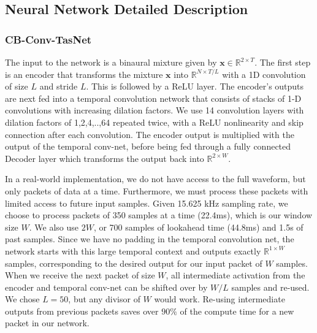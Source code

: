 \documentclass [11pt, proquest] {uwthesis}[2020/02/24]
\begin{document}
\subsection{Neural Network Detailed Description}


\subsubsection{CB-Conv-TasNet}
The input to the network is a binaural mixture given by $\textbf{x} \in \mathbb{R}^{2 \times T}$. The first step is an encoder that transforms the mixture $\textbf{x}$ into $\mathbb{R}^{N \times T/L}$ with a 1D convolution of size $L$ and stride $L$. This is followed by a ReLU layer. The encoder's outputs are next fed into a temporal convolution network that consists of stacks of 1-D convolutions with increasing dilation factors. We use 14 convolution layers with dilation factors of 1,2,4,..,64 repeated twice, with a ReLU nonlinearity and skip connection after each convolution. The encoder output is multiplied with the output of the temporal conv-net, before being fed through a fully connected Decoder layer which transforms the output back into $\mathbb{R}^{2 \times W}$. %



In a real-world implementation, we do not have access to the full waveform, but only packets of data at a time. Furthermore, we must process these packets with limited access to future input samples. Given  15.625 kHz sampling rate, we choose to process packets of 350 samples at a time (22.4ms), which is our  window size $W$. We also use $2W$, or 700 samples of lookahead time (44.8ms) and 1.5s of past samples. Since we have no padding in the temporal convolution net, the network starts with this large temporal context and outputs exactly $\mathbb{R}^{1 \times W}$ samples, corresponding to the desired output for our input packet of $W$ samples. When we receive the next packet of size $W$, all intermediate activation from the encoder and temporal conv-net can be shifted over by $W / L$ samples and re-used. We chose $L = 50$, but any divisor of $W$ would work. Re-using intermediate outputs from previous packets saves over $90\%$ of the compute time for a new packet in our network. %
\end{document}
